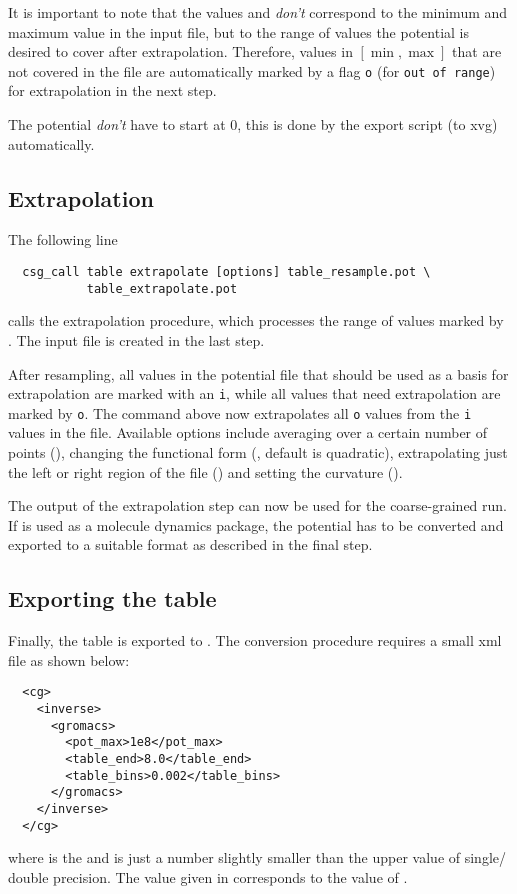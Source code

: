 It is important to note that the values  and  \textit{don't} correspond to the minimum and maximum value in the input file, but to the range of values the potential is desired to cover after extrapolation. Therefore, values in $[ \min,\max ]$ that are not covered in the file are automatically marked by a flag \texttt{o} (for \texttt{out of range}) for extrapolation in the next step.

The potential \textit{don't} have to start at 0, this is done by the export script (to xvg) automatically.

\subsection*{Extrapolation}
The following line
\begin{verbatim}
  csg_call table extrapolate [options] table_resample.pot \
           table_extrapolate.pot
\end{verbatim}
calls the extrapolation procedure, which processes the range of values marked by . The input file is  created in the last step.

After resampling, all values in the potential file that should be used as a basis for extrapolation are marked with an \texttt{i}, while all values that need extrapolation are marked by \texttt{o}. The command above now extrapolates all \texttt{o} values from the \texttt{i} values in the file. Available options include averaging over a certain number of points (), changing the functional form (, default is quadratic), extrapolating just the left or right region of the file () and setting the curvature ().

The output  of the extrapolation step can now be used for the coarse-grained run. If \gromacs is used as a molecule dynamics package, the potential has to be converted and exported to a suitable \gromacs format as described in the final step.

\subsection*{Exporting the table}
Finally, the table is exported to . The conversion procedure requires a small xml file  as shown below:
\begin{verbatim}
  <cg>
    <inverse>
      <gromacs>
        <pot_max>1e8</pot_max>
        <table_end>8.0</table_end>
        <table_bins>0.002</table_bins>
      </gromacs>
    </inverse>
  </cg>
\end{verbatim}
where  is the \gromacs {} and  is just a number slightly smaller than the upper value of single/ double precision. The value given in  corresponds to the  value of .

